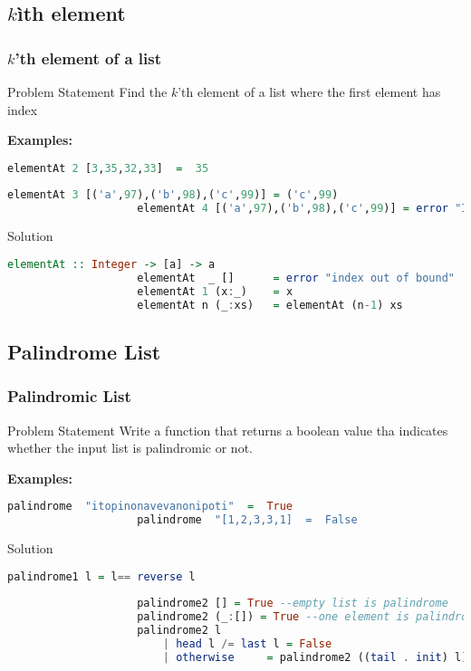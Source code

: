 \subsection{$k$ìth element}
\begin{frame}[fragile]\frametitle{$k$'th element of a list}


\begin{block}{Problem Statement}
			Find the $k$'th element of a list where the first element has index
\end{block}	
\textbf{Examples:}
		\begin{lstlisting}[language=Haskell,basicstyle=\footnotesize\ttfamily]
					elementAt 2 [3,35,32,33]  =  35 
		\end{lstlisting}
		\pause
		\begin{lstlisting}[language=Haskell,basicstyle=\footnotesize\ttfamily]
					elementAt 3 [('a',97),('b',98),('c',99)] = ('c',99)
					elementAt 4 [('a',97),('b',98),('c',99)] = error "Index out of bound" 
		\end{lstlisting}
					
\pause \pause
\begin{alertblock}{Solution}
			\begin{lstlisting}[language=Haskell]
					elementAt :: Integer -> [a] -> a
					elementAt  _ [] 	 = error "index out of bound"
					elementAt 1 (x:_)	 = x
					elementAt n (_:xs)   = elementAt (n-1) xs 
		\end{lstlisting}
\end{alertblock}	

\end{frame}


\subsection{Palindrome List}
\begin{frame}[fragile]\frametitle{Palindromic List}


\begin{block}{Problem Statement}
			Write a function that returns a boolean value tha indicates whether the input
			list is palindromic or not.
\end{block} \pause	
\textbf{Examples:}
		\begin{lstlisting}[language=Haskell,basicstyle=\footnotesize\ttfamily]
					palindrome  "itopinonavevanonipoti"  =  True
					palindrome  "[1,2,3,3,1]  =  False
		\end{lstlisting}
\pause
\begin{alertblock}{Solution}
			\begin{lstlisting}[language=Haskell,basicstyle=\footnotesize\ttfamily]
					palindrome1 l = l== reverse l
					
					palindrome2 [] = True --empty list is palindrome
					palindrome2 (_:[]) = True --one element is palindrome
					palindrome2 l 
    					| head l /= last l = False
    					| otherwise 	= palindrome2 ((tail . init) l)
					
		\end{lstlisting}
\end{alertblock}	

\end{frame}


